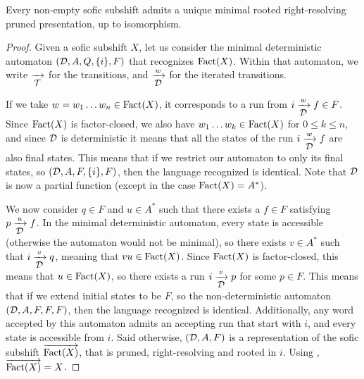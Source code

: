 \begin{theorem}[Uniqueness]\label{appthm:minimal-uniqueness-inf}
	Every non-empty sofic subshift admits a unique minimal rooted right-resolving pruned presentation, up to isomorphism.
\end{theorem}
\begin{proof}
	Given a sofic subshift $X$, let us consider the minimal deterministic automaton $({\mathcal{D}},A,Q,\{i\},F)$ that recognizes $\mathrm{Fact}(X)$. Within that automaton, we write $\xrightarrow[\text{\small ${\mathcal{T}}$}]{}$ for the transitions, and $\xrightarrow[\text{\small ${\mathcal{D}}$}]{w}$ for the iterated transitions.	
	
	If we take $w = w_1\dots w_n \in \mathrm{Fact}(X)$, it corresponds to a run from $i \xrightarrow[\text{\small ${\mathcal{D}}$}]{w} f \in F$. Since $\mathrm{Fact}(X)$ is factor-closed, we also have $w_1\dots w_k \in \mathrm{Fact}(X)$ for $0 \leq k \leq n$, and since ${\mathcal{D}}$ is deterministic it means that all the states of the run  $i \xrightarrow[\text{\small ${\mathcal{D}}$}]{w} f$ are also final states. This means that if we restrict our automaton to only its final states, so $({\mathcal{D}},A,F,\{i\},F)$, then the language recognized is identical. Note that ${\mathcal{D}}$ is now a partial function (except in the case $\mathrm{Fact}(X) = A^*$).
	
	We now consider $q\in F$ and $u \in A^*$ such that there exists a $f \in F$ satisfying $p \xrightarrow[\text{\small ${\mathcal{D}}$}]{u} f$. In the minimal deterministic automaton, every state is accessible (otherwise the automaton would not be minimal), so there exists $v \in A^*$ such that $i \xrightarrow[\text{\small ${\mathcal{D}}$}]{v} q$, meaning that $vu \in \mathrm{Fact}(X)$. Since $\mathrm{Fact}(X)$ is factor-closed, this means that $u \in \mathrm{Fact}(X)$, so there exists a run $i \xrightarrow[\text{\small ${\mathcal{D}}$}]{v} p$ for some $p \in F$. This means that if we extend initial states to be $F$, so the non-deterministic automaton $({\mathcal{D}},A,F,F,F)$, then the language recognized is identical. Additionally, any word accepted by this automaton admits an accepting run that start with $i$, and every state is accessible from $i$. Said otherwise, $({\mathcal{D}},A,F)$ is a representation of the sofic subshift $\overrightarrow{\mathrm{Fact}(X)}$, that is pruned, right-resolving and rooted in $i$. Using , $\overrightarrow{\mathrm{Fact}(X)} = X$.
	

\end{proof}
